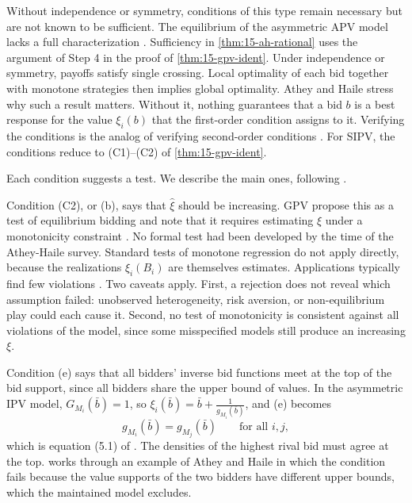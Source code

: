 Without independence or symmetry, conditions of this type remain necessary but are not known to be sufficient. The equilibrium of the asymmetric APV model lacks a full characterization \citep[Theorem 5.1]{AtheyHaile2007}. Sufficiency in \cref{thm:15-ah-rational} uses the argument of Step 4 in the proof of \cref{thm:15-gpv-ident}. Under independence or symmetry, payoffs satisfy single crossing. Local optimality of each bid together with monotone strategies then implies global optimality. Athey and Haile stress why such a result matters. Without it, nothing guarantees that a bid $b$ is a best response for the value $\xi_i(b)$ that the first-order condition assigns to it. Verifying the conditions is the analog of verifying second-order conditions \citep[Section 5.1]{AtheyHaile2007}. For SIPV, the conditions reduce to (C1)--(C2) of \cref{thm:15-gpv-ident}.

Each condition suggests a test. We describe the main ones, following \citet[Sections 5.2--5.5]{AtheyHaile2007}.

 Condition (C2), or (b), says that $\hat\xi$ should be increasing. GPV propose this as a test of equilibrium bidding and note that it requires estimating $\xi$ under a monotonicity constraint \citep[p.~552]{GuerrePerrigneVuong2000}. No formal test had been developed by the time of the Athey-Haile survey. Standard tests of monotone regression do not apply directly, because the realizations $\xi_i(B_i)$ are themselves estimates. Applications typically find few violations \citep{HendricksPinksePorter2003,HaileHongShum2003}. Two caveats apply. First, a rejection does not reveal which assumption failed: unobserved heterogeneity, risk aversion, or non-equilibrium play could each cause it. Second, no test of monotonicity is consistent against all violations of the model, since some misspecified models still produce an increasing $\xi$.

 Condition (e) says that all bidders' inverse bid functions meet at the top of the bid support, since all bidders share the upper bound of values. In the asymmetric IPV model, $G_{M_i}(\bar b)=1$, so $\xi_i(\bar b)=\bar b+\frac{1}{g_{M_i}(\bar b)}$, and (e) becomes
\begin{equation}\label{eq:15-boundary-test}
g_{M_i}(\bar b)=g_{M_j}(\bar b)\qquad\text{for all }i,j,
\end{equation}
which is equation (5.1) of \citet{AtheyHaile2007}. The densities of the highest rival bid must agree at the top.  works through an example of Athey and Haile in which the condition fails because the value supports of the two bidders have different upper bounds, which the maintained model excludes.

